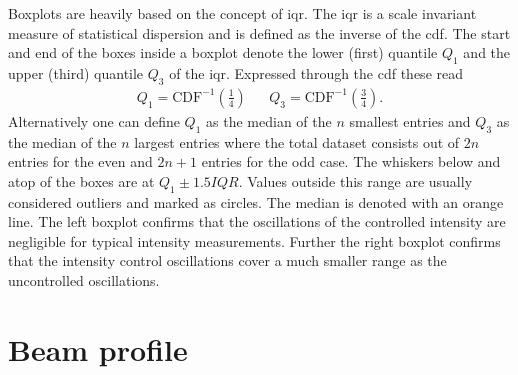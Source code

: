 Boxplots are heavily based on the concept of \gls{iqr}. The \gls{iqr} is a
scale invariant measure of statistical dispersion and is defined as the
inverse of the \gls{cdf}. The start and end of the boxes inside a boxplot
denote the lower (first) quantile $Q_1$ and the upper (third) quantile $Q_3$
of the \gls{iqr}. Expressed through the \gls{cdf} these read
\begin{align}
  Q_1=\text{CDF}^{-1}{\left(\frac{1}{4}\right)} &&
  Q_3=\text{CDF}^{-1}{\left(\frac{3}{4}\right)}.
\end{align}
Alternatively one can define $Q_1$ as the median of the $n$ smallest entries
and $Q_3$ as the median of the $n$ largest entries where the total dataset
consists out of $2n$ entries for the even and $2n+1$ entries for the odd case.
The whiskers below and atop of the boxes are at $Q_1\pm1.5IQR$. Values outside
this range are usually considered outliers and marked as circles. The median
is denoted with an orange line. The left boxplot confirms that the
oscillations of the controlled intensity are negligible for typical intensity
measurements. Further the right boxplot confirms that the intensity control
oscillations cover a much smaller range as the uncontrolled oscillations.

\section{Beam profile}

